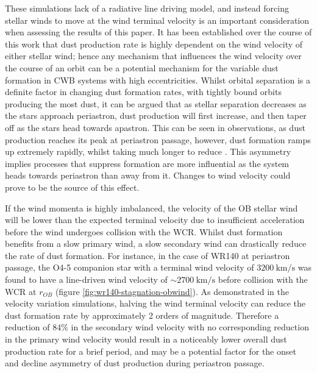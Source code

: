 These simulations lack of a radiative line driving model, and instead forcing stellar winds to move at the wind terminal velocity is an important consideration when assessing the results of this paper.
It has been established over the course of this work that dust production rate is highly dependent on the wind velocity of either stellar wind; hence any mechanism that influences the wind velocity over the course of an orbit can be a potential mechanism for the variable dust formation in CWB systems with high eccentricities.
Whilst orbital separation is a definite factor in changing dust formation rates, with tightly bound orbits producing the most dust, it can be argued that as stellar separation decreases as the stars approach periastron, dust production will first increase, and then taper off as the stars head towards apastron.
This can be seen in observations, as dust production reaches its peak at periastron passage, however, dust formation ramps up extremely rapidly, whilst taking much longer to reduce \parencite{williamsDustFormationCollidingwind2008,williams_orbitally_2009}.
This asymmetry implies processes that suppress formation are more influential as the system heads towards periastron than away from it.
Changes to wind velocity could prove to be the source of this effect.

If the wind momenta is highly imbalanced, the velocity of the OB stellar wind will be lower than the expected terminal velocity due to insufficient acceleration before the wind undergoes collision with the WCR.
Whilst dust formation benefits from a slow primary wind, a slow secondary wind can drastically reduce the rate of dust formation.
For instance, in the case of WR140 at periastron passage, the O4-5 companion star with a terminal wind velocity of $\SI{3200}{\kilo\metre\per\second}$ was found to have a line-driven wind velocity of $\sim \SI{2700}{\kilo\metre\per\second}$ before collision with the WCR at $r_{OB}$ (figure \ref{fig:wr140-stagnation-obwind}).
As demonstrated in the velocity variation simulations, halving the wind terminal velocity can reduce the dust formation rate by approximately 2 orders of magnitude.
Therefore a reduction of $84\%$ in the secondary wind velocity with no corresponding reduction in the primary wind velocity would result in a noticeably lower overall dust production rate for a brief period, and may be a potential factor for the onset and decline asymmetry of dust production during periastron passage. %

